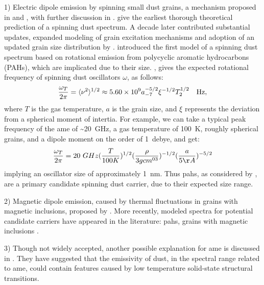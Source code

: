    1) Electric dipole emission by spinning small dust grains, a mechanism proposed in \cite{erickson57} and \cite{hoyle70}, with further discussion in \cite{ferrara94}. \cite{draine98b} give the earliest thorough theoretical prediction of a spinning dust spectrum. A decade later \cite{ali-haimoud09} contributed substantial updates, expanded modeling of grain excitation mechanisms and adoption of an updated grain size distribution by \cite{weingartner01}. \cite{ysard10a} introduced the first model of a spinning dust spectrum based on rotational emission from polycyclic aromatic hydrocarbons (PAHs), which are implicated due to their size.  \cite{draine98b}, gives the expected rotational frequency of spinning dust oscillators $\omega$,  as follows:
        \begin{equation}
        {\omega_T\over 2\pi} =
        \langle\nu^2\rangle^{1/2}
        \approx 5.60\times 10^9 a_{-7}^{-5/2}\xi^{-1/2}T_2^{1/2}~~~{\rm Hz},
        \label{eq:nurms}
        \end{equation}
    where $T$ is the gas temperature, $a$ is the grain size, and $\xi$ represents the deviation from a spherical moment of intertia. For example, we can take a typical peak frequency of the \acrshort{ame} of \textasciitilde{}20~GHz, a gas temperature of 100~K, roughly spherical grains, and a dipole moment on the order of 1~debye, and get:
        \begin{equation}
            {\omega_T\over 2\pi} =
                20~GHz({T\over 100K})^{1/2}({\rho \over{3gcm^{03}}})^{-1/2}({a\over 5\AA{}})^{-5/2}
            \label{eq:nurms_ex}
        \end{equation}
    implying an oscillator size of approximately 1~nm. Thus \acrshort{pah}s, as considered by \cite{ysard10a}, are a primary candidate spinning dust carrier, due to their expected size range.

    2) Magnetic dipole emission, caused by thermal fluctuations in grains with magnetic inclusions, proposed by \cite{draine99}.
     More recently, modeled spectra for potential candidate carriers have appeared in the literature: \acrshort{pah}s, grains with magnetic inclusions \citep{draine13, ali-haimoud14, hoang16a}.

    3) Though not widely accepted, another possible explanation for \acrshort{ame} is discussed in \cite{jones09}. They have suggested that the emissivity of dust, in the spectral range related to \acrshort{ame}, could contain features caused by low temperature solid-state structural transitions.

